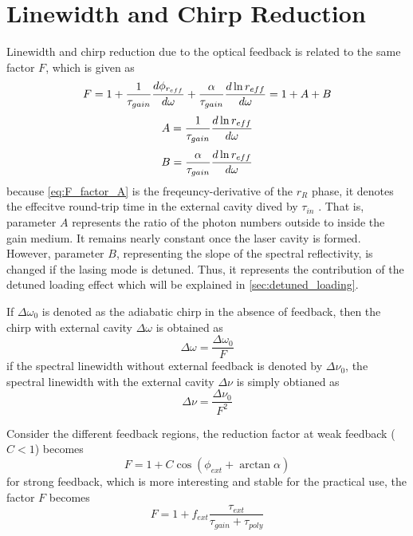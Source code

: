 \section{Linewidth and Chirp Reduction}
\label{sec:linewidth_and_chirp_reduction}
Linewidth and chirp reduction due to the optical feedback is related to the same factor $F$, which is given as \cite{kazarinov1987relation}
\begin{equation}
    F=1+\frac{1}{\tau_{gain}}\dv{\phi_{r_{eff}}}{\omega}+\frac{\alpha}{\tau_{gain}}\dv{\ln{r_{eff}}}{\omega}=1+A+B
    \label{eq:F_factor}
\end{equation}
\begin{equation}
    A=\frac{1}{\tau_{gain}}\dv{\ln{r_{eff}}}{\omega}
    \label{eq:F_factor_A}
\end{equation}
\begin{equation}
    B=\frac{\alpha}{\tau_{gain}}\dv{\ln{r_{eff}}}{\omega}
    \label{eq:F_factor_B}
\end{equation}
because \autoref{eq:F_factor_A} is the freqeuncy-derivative of the $r_R$ phase, it denotes the effecitve round-trip time in the external cavity dived by $\tau_{in}$ \cite{}. That is, parameter $A$ represents the ratio of the photon numbers outside to inside the gain medium. It remains nearly constant once the laser cavity is formed. However, parameter $B$, representing the slope of the spectral reflectivity, is changed if the lasing mode is detuned. Thus, it represents the contribution of the detuned loading effect which will be explained in \autoref{sec:detuned_loading}.

If $\Delta\omega_0$ is denoted as the adiabatic chirp in the absence of feedback, then the chirp with external cavity $\Delta\omega$ is obtained as \cite{kazarinov1987relation}
\begin{equation}
    \Delta\omega=\frac{\Delta\omega_0}{F}
\end{equation}
if the spectral linewidth without external feedback is denoted by $\Delta\nu_0$, the spectral linewidth with the external cavity $\Delta\nu$ is simply obtianed as \cite{}
\begin{equation}
    \Delta\nu=\frac{\Delta\nu_0}{F^2}
\end{equation}

Consider the different feedback regions, the reduction factor at weak feedback ($C<1$) becomes
\begin{equation}
    F=1+C\cos(\phi_{ext}+\arctan\alpha)
    \label{F_weak_feedback}
\end{equation}
for strong feedback, which is more interesting and stable for the practical use, the factor $F$ becomes
\begin{equation}
    F=1+f_{ext}\frac{\tau_{ext}}{\tau_{gain}+\tau_{poly}}
    \label{F_strogn_feedback}
\end{equation}

